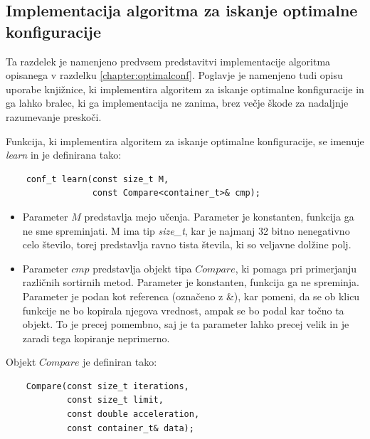 \documentclass[a4paper,oneside,12pt]{article}
\begin{document}
\subsection{Implementacija algoritma za iskanje optimalne konfiguracije}
\label{chapter:optimalconfimplementation}
Ta razdelek je namenjeno predvsem predstavitvi implementacije algoritma opisanega v
razdelku \ref{chapter:optimalconf}. Poglavje je namenjeno tudi opisu uporabe knjižnice, ki
implementira algoritem za iskanje optimalne konfiguracije in ga lahko bralec, ki ga
implementacija ne zanima, brez večje škode za nadaljnje razumevanje preskoči.

Funkcija, ki implementira algoritem za iskanje optimalne konfiguracije, 
se imenuje \emph{learn} in je definirana tako:

\begin{lstlisting}
    conf_t learn(const size_t M, 
                 const Compare<container_t>& cmp);
\end{lstlisting}

\begin{itemize}
  \item Parameter $M$ predstavlja mejo učenja. Parameter je
    konstanten, funkcija ga ne sme spreminjati. M ima tip \emph{size\_t}, kar je najmanj 32
    bitno nenegativno celo število, torej predstavlja ravno tista števila, ki so veljavne
    dolžine polj.
  \item Parameter $cmp$ predstavlja objekt tipa $Compare$, ki pomaga pri primerjanju
    različnih sortirnih metod. Parameter je konstanten, funkcija ga ne spreminja.
    Parameter je podan kot referenca (označeno z \&), kar pomeni, da se ob klicu funkcije
    ne bo kopirala njegova vrednost, ampak se bo podal kar točno ta objekt. To je precej
    pomembno, saj je  ta parameter lahko precej velik in je zaradi tega
    kopiranje neprimerno. 
\end{itemize}

Objekt $Compare$ je definiran tako:
\begin{lstlisting}
    Compare(const size_t iterations, 
            const size_t limit, 
            const double acceleration, 
            const container_t& data);
\end{lstlisting}
\end{document}

